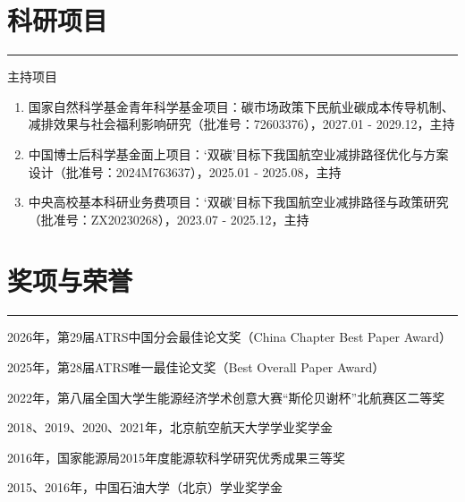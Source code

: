\documentclass[letterpaper]{article}
\renewenvironment{itemize}{
  \begin{list}{}{
    \setlength{\leftmargin}{0.2in}
    \setlength{\itemsep}{0.1in}
    \setlength{\parskip}{0.025in}
    \setlength{\parsep}{0.025in}
  }
}{
  \end{list}
}
\begin{document}
\section*{科研项目}
\hrule
\vspace{0.25cm}
  \begin{itemize}
    \item 主持项目
    \begin{enumerate}
      \item 国家自然科学基金青年科学基金项目：碳市场政策下民航业碳成本传导机制、减排效果与社会福利影响研究（批准号：72603376），2027.01 - 2029.12，主持
      \item 中国博士后科学基金面上项目：‘双碳’目标下我国航空业减排路径优化与方案设计（批准号：2024M763637），2025.01 - 2025.08，主持
      \item 中央高校基本科研业务费项目：‘双碳’目标下我国航空业减排路径与政策研究（批准号：ZX20230268），2023.07 - 2025.12，主持
    \end{enumerate}
  \end{itemize}


\section*{奖项与荣誉}
\hrule
\vspace{0.25cm}
  \begin{itemize}
    \item 2026年，第29届ATRS中国分会最佳论文奖（China Chapter Best Paper Award）
    \vspace{-0.3cm}
    \item 2025年，第28届ATRS唯一最佳论文奖（Best Overall Paper Award）
    \vspace{-0.3cm}
    \item 2022年，第八届全国大学生能源经济学术创意大赛“斯伦贝谢杯”北航赛区二等奖
    \vspace{-0.3cm}
    \item 2018、2019、2020、2021年，北京航空航天大学学业奖学金
    \vspace{-0.3cm}
    \item 2016年，国家能源局2015年度能源软科学研究优秀成果三等奖
    \vspace{-0.3cm}
    \item 2015、2016年，中国石油大学（北京）学业奖学金
  \end{itemize}
\end{document}
